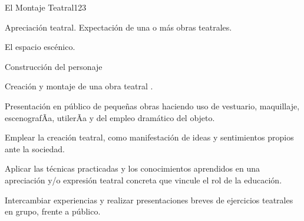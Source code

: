 \begin{syllabus}
\begin{unit}{El  Montaje Teatral}{}{12}{3}
\begin{topics}
	\item Apreciación teatral. Expectación de una o más obras teatrales.
	\item El espacio escénico.
	\item Construcción del personaje
	\item Creación y montaje de una obra teatral .
	\item Presentación en público de pequeñas obras haciendo uso de vestuario, maquillaje, escenografÃ­a, utilerÃ­a y del empleo dramático del objeto.
\end{topics}
\begin{unitgoals}
	\item Emplear  la creación teatral, como manifestación de ideas y sentimientos propios ante la sociedad.
	\item Aplicar las técnicas practicadas y los conocimientos aprendidos en una apreciación y/o expresión teatral concreta que vincule el rol de la educación.
	\item Intercambiar experiencias y realizar presentaciones breves de ejercicios teatrales en grupo, frente a público.  
\end{unitgoals}
\end{unit}



\begin{coursebibliography}

\end{coursebibliography}
\end{syllabus}
